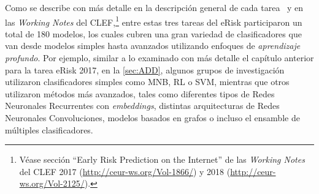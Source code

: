 Como se describe con más detalle en la descripción general de cada tarea~\cite{losada2017erisk, losada2018overview} y en las \emph{Working Notes} del CLEF,\footnote{Véase sección ``Early Risk Prediction on the Internet'' de las \emph{Working Notes} del CLEF 2017 (\url{http://ceur-ws.org/Vol-1866/}) y 2018 (\url{http://ceur-ws.org/Vol-2125/}).} entre estas tres tareas del eRisk participaron un total de 180 modelos, los cuales cubren una gran variedad de clasificadores que van desde modelos simples hasta avanzados utilizando enfoques de \emph{aprendizaje profundo}.
Por ejemplo, similar a lo examinado con más detalle el capítulo anterior para la tarea eRisk 2017, en la \autoref{sec:ADD}, algunos grupos de investigación utilizaron clasificadores simples como \ac{MNB}, \ac{RL} o \ac{SVM}, mientras que otros utilizaron métodos más avanzados, tales como diferentes tipos de Redes Neuronales Recurrentes con \emph{embeddings}, distintas arquitecturas de Redes Neuronales Convoluciones, modelos basados en grafos o incluso el ensamble de múltiples clasificadores.

